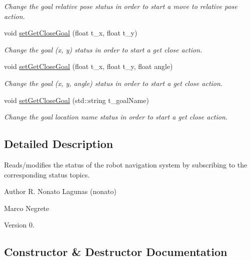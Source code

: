 \begin{DoxyCompactItemize}
\begin{DoxyCompactList}\small\item\em Change the goal relative pose status in order to start a move to relative pose action. \end{DoxyCompactList}\item 
void \hyperlink{class_navigation_status_ab9b2215d5144a13e2e033b17d9654a8f}{set\+Get\+Close\+Goal} (float t\+\_\+x, float t\+\_\+y)
\begin{DoxyCompactList}\small\item\em Change the goal (x, y) status in order to start a get close action. \end{DoxyCompactList}\item 
void \hyperlink{class_navigation_status_a1a6a558780b9be3debd082aaa5c3abf6}{set\+Get\+Close\+Goal} (float t\+\_\+x, float t\+\_\+y, float angle)
\begin{DoxyCompactList}\small\item\em Change the goal (x, y, angle) status in order to start a get close action. \end{DoxyCompactList}\item 
void \hyperlink{class_navigation_status_a6ab45826292bef7eb478f1acdec98cdb}{set\+Get\+Close\+Goal} (std\+::string t\+\_\+goal\+Name)
\begin{DoxyCompactList}\small\item\em Change the goal location name status in order to start a get close action. \end{DoxyCompactList}\end{DoxyCompactItemize}


\subsection{Detailed Description}
Reads/modifies the status of the robot navigation system by subscribing to the corresponding status topics. 

\begin{DoxyAuthor}{Author}
R. Nonato Lagunas (nonato) 

Marco Negrete 
\end{DoxyAuthor}
\begin{DoxyVersion}{Version}
0. 
\end{DoxyVersion}


\subsection{Constructor \& Destructor Documentation}
